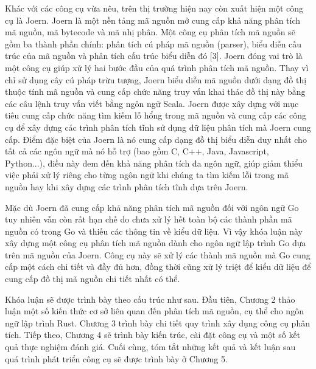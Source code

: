 Khác với các công cụ vừa nêu, trên thị trường hiện nay còn xuất hiện một công cụ
là Joern. Joern là một nền tảng mã nguồn mở cung cấp khả năng phân tích mã nguồn,
mã bytecode và mã nhị phân. Một công cụ phân tích mã nguồn sẽ gồm ba thành phần
chính: phân tích cú pháp mã nguồn (parser), biểu diễn cấu trúc của mã nguồn và phân
tích cấu trúc biểu diễn đó [3]. Joern đóng vai trò là một công cụ giúp xử lý hai bước đầu
của quá trình phân tích mã nguồn. Thay vì chỉ sử dụng cây cú pháp trừu tượng, Joern
biểu diễn mã nguồn dưới dạng đồ thị thuộc tính mã nguồn và cung cấp chức năng truy
vấn khai thác đồ thị này bằng các câu lệnh truy vấn viết bằng ngôn ngữ Scala. Joern
được xây dựng với mục tiêu cung cấp chức năng tìm kiếm lỗ hổng trong mã nguồn và
cung cấp các công cụ để xây dựng các trình phân tích tĩnh sử dụng dữ liệu phân tích mà
Joern cung cấp. Điểm đặc biệt của Joern là nó cung cấp dạng đồ thị biểu diễn duy nhất
cho tất cả các ngôn ngữ mà nó hỗ trợ (bao gồm C, C++, Java, Javascript, Python...), điều
này đem đến khả năng phân tích đa ngôn ngữ, giúp giảm thiểu việc phải xử lý riêng cho
từng ngôn ngữ khi chúng ta tìm kiếm lỗi trong mã nguồn hay khi xây dựng các trình
phân tích tĩnh dựa trên Joern.

Mặc dù Joern đã cung cấp khả năng phân tích mã nguồn đối với ngôn ngữ Go tuy
nhiên vẫn còn rất hạn chế do chưa xử lý hết toàn bộ các thành phần mã nguồn có trong
Go và thiếu các thông tin về kiểu dữ liệu. Vì vậy khóa luận này xây dựng một công cụ
phân tích mã nguồn dành cho ngôn ngữ lập trình Go dựa trên mã nguồn của Joern. Công
cụ này sẽ xử lý các thành mã nguồn mà Go cung cấp một cách chi tiết và đầy đủ hơn,
đồng thời cũng xử lý triệt để kiểu dữ liệu để cung cấp đồ thị mã nguồn chi tiết nhất có
thể.

Khóa luận sẽ được trình bày theo cấu trúc như sau. Đầu tiên, Chương 2 thảo luận một số kiến thức cơ sở liên quan đến phân tích mã nguồn, cụ thể cho ngôn ngữ lập trình Rust. Chương 3  trình bày chi tiết quy trình xây dụng công cụ phân tích. Tiếp theo, Chương 4 sẽ trình bày kiến trúc, cài đặt công cụ và một số kết quả thực nghiệm đánh giá. Cuối cùng, tóm tắt những kết quả và kết luận sau quá trình phát triển công cụ sẽ được trình bày ở Chương 5.

